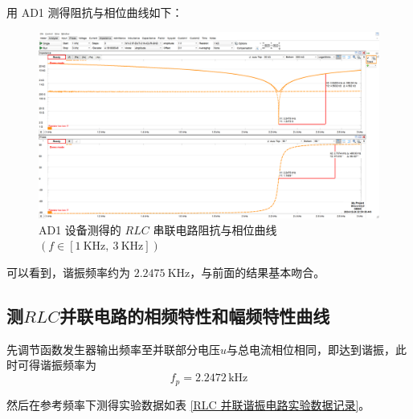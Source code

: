 \documentclass[UTF8]{article}
\theoremstyle{MyLineTheoremStyle} %
\theoremstyle{MyBlockTheoremStyle} %
\theoremstyle{MySubsubsectionStyle} %
\begin{document}
用 AD1 测得阻抗与相位曲线如下：
\begin{figure}[H]\centering
    \includegraphics[width=\columnwidth]{assets/1/20241224 RLC 实验, RLC 串联, 阻抗曲线.png}
    \caption{AD1 设备测得的 $RLC$ 串联电路阻抗与相位曲线 $(f \in [1 \ \mathrm{KHz},\ 3 \ \mathrm{KHz}])$}
\end{figure}
可以看到，谐振频率约为 $2.2475 \ \mathrm{KHz}$，与前面的结果基本吻合。


\subsection{测$ RLC $并联电路的相频特性和幅频特性曲线}

先调节函数发生器输出频率至并联部分电压$ u $与总电流相位相同，即达到谐振，此时可得谐振频率为
\begin{equation}
f_p=2.2472\,\mathrm{kHz}
\end{equation}

然后在参考频率下测得实验数据如表 \ref{RLC 并联谐振电路实验数据记录}。
\end{document}
